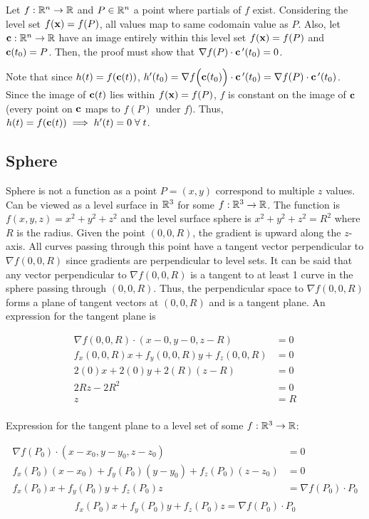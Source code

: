 Let $f:\mathbb{R}^n\to \mathbb{R}$ and $P\in \mathbb{R}^n$ a point where partials of $f$ exist. Considering the level set $f(\textbf{x})=f(P)$,
all values map to same codomain value as $P$. Also, let $\textbf{c}:\mathbb{R}^n\to \mathbb{R}$ have an image entirely within this level set $f(\textbf{x})=f(P)$
and $\textbf{c}(t_0)=P$. Then, the proof must show that $\nabla f(P)\cdot \textbf c\,'(t_0)=0$.

Note that since $h(t)=f(\textbf{c}(t))$, $h'(t_0)=\nabla f \Big(\textbf c (t_0) \Big)\cdot \textbf c\,'(t_0)=\nabla f (P)\cdot  \textbf c\,'(t_0)$.
Since the image of $\textbf{c}(t)$ lies within $f(\textbf{x})=f(P)$, $f$ is constant on the image of $\textbf{c}$ (every point on $\textbf{c}$ maps to $f(P)$ under $f$).
Thus, $h(t)=f(\textbf{c}(t))\implies h'(t)=0\;\forall\;t$.

\subsection{Sphere}

Sphere is not a function as a point $P=(x,y)$ correspond to multiple $z$ values.
Can be viewed as a level surface in $\mathbb{R}^3$ for some $f:\mathbb{R}^3\to \mathbb{R}$. The function is $f(x,y,z)=x^2+y^2+z^2$
and the level surface sphere is $x^2+y^2+z^2=R^2$ where $R$ is the radius.
Given the point $(0,0,R)$, the gradient is upward along the $z$-axis. All curves passing through this point
have a tangent vector perpendicular to $\nabla f(0,0,R)$ since gradients are perpendicular to level sets.
It can be said that any vector perpendicular to $\nabla f(0,0,R)$ is a tangent to at least 1 curve in the sphere passing through $(0,0,R)$.
Thus, the perpendicular space to $\nabla f(0,0,R)$ forms a plane of tangent vectors at $(0,0,R)$ and is a tangent plane.
An expression for the tangent plane is 

\begin{align*}
    \nabla f (0,0,R)\cdot(x-0, y-0, z-R)&=0\\
    f_x(0,0,R)x+f_y(0,0,R)y+f_z(0,0,R)&=0\\
    2(0)x+2(0)y+2(R)(z-R)&=0\\
    2Rz-2R^2&=0\\
    z&=R\\
\end{align*}

Expression for the tangent plane to a level set of some $f:\mathbb{R}^3\to \mathbb{R}$:

\begin{align*}
    \nabla f (P_0)\cdot(x-x_0, y-y_0,z- z_0)&=0\\
    f_x(P_0)(x-x_0)+f_y(P_0)(y-y_0)+f_z(P_0)(z-z_0)&=0\\
    f_x(P_0)x+f_y(P_0)y+f_z(P_0)z&=\nabla f(P_0)\cdot P_0\\
\end{align*}
$$\boxed{f_x(P_0)x+f_y(P_0)y+f_z(P_0)z=\nabla f(P_0)\cdot P_0}$$

